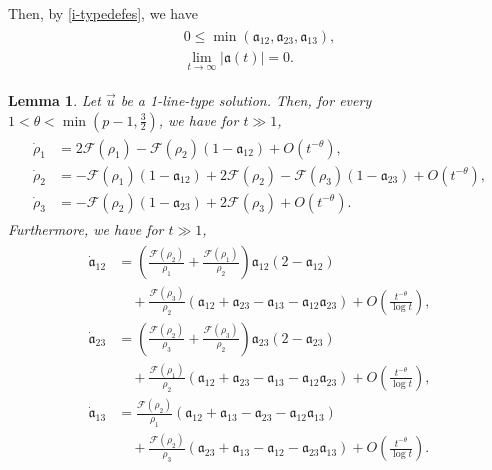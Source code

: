 \documentclass[reqno]{amsart}
\theoremstyle{plain}
\newtheorem{lemma}[theorem]{Lemma}
\theoremstyle{definition}
\numberwithin{equation}{section}
\begin{document}
Then, by \eqref{i-typedefes}, we have
\begin{align}\label{linenaisekiga1}
\begin{aligned}
0\leq \min{(\mathfrak{a}_{12},\mathfrak{a}_{23},\mathfrak{a}_{13})},
\\
\lim_{t\to\infty}|\mathfrak{a}(t)|=0.
\end{aligned}
\end{align}





\begin{lemma}\label{line-type-naisekinagasaode}
Let $\vec{u}$ be a 1-line-type solution. Then, for every $1<\theta<\min{(p-1,\frac{3}{2})}$, we have for $t\gg 1$,
\begin{align}\label{1-line-typenagasaode}
\begin{aligned}
\dot{\rho}_1&=2\mathcal{F}(\rho_1)-\mathcal{F}(\rho_2)(1-\mathfrak{a}_{12})+O\left(t^{-\theta}\right),
\\
\dot{\rho}_2&=-\mathcal{F}(\rho_1)(1-\mathfrak{a}_{12})+2\mathcal{F}(\rho_2)-\mathcal{F}(\rho_3)(1-\mathfrak{a}_{23})+O\left(t^{-\theta}\right),
\\
\dot{\rho}_3&=-\mathcal{F}(\rho_2)(1-\mathfrak{a}_{23})+2\mathcal{F}(\rho_3)+O\left(t^{-\theta}\right).
\end{aligned}
\end{align}
Furthermore, we have for $t\gg 1$,
\begin{align}\label{kinenaisekiode}
\begin{aligned}
\dot{\mathfrak{a}}_{12}&=\left(\frac{\mathcal{F}(\rho_2)}{\rho_1}+\frac{\mathcal{F}(\rho_1)}{\rho_2}\right)\mathfrak{a}_{12}\left(2-\mathfrak{a}_{12}\right)
\\
&\quad+\frac{\mathcal{F}(\rho_3)}{\rho_2}\left(\mathfrak{a}_{12}+\mathfrak{a}_{23}-\mathfrak{a}_{13}-\mathfrak{a}_{12}\mathfrak{a}_{23}\right)+O\left(\frac{t^{-\theta}}{\log{t}}\right),
\\
\dot{\mathfrak{a}}_{23}&=\left(\frac{\mathcal{F}(\rho_2)}{\rho_3}+\frac{\mathcal{F}(\rho_3)}{\rho_2}\right)\mathfrak{a}_{23}\left(2-\mathfrak{a}_{23}\right)
\\
&\quad+\frac{\mathcal{F}(\rho_1)}{\rho_2}\left(\mathfrak{a}_{12}+\mathfrak{a}_{23}-\mathfrak{a}_{13}-\mathfrak{a}_{12}\mathfrak{a}_{23}\right)+O\left(\frac{t^{-\theta}}{\log{t}}\right),
\\
\dot{\mathfrak{a}}_{13}&=\frac{\mathcal{F}(\rho_2)}{\rho_1}\left(\mathfrak{a}_{12}+\mathfrak{a}_{13}-\mathfrak{a}_{23}-\mathfrak{a}_{12}\mathfrak{a}_{13}\right)
\\
&\quad+\frac{\mathcal{F}(\rho_2)}{\rho_3}\left(\mathfrak{a}_{23}+\mathfrak{a}_{13}-\mathfrak{a}_{12}-\mathfrak{a}_{23}\mathfrak{a}_{13}\right)+O\left(\frac{t^{-\theta}}{\log{t}}\right).
\end{aligned}
\end{align}
\end{lemma}
\end{document}
